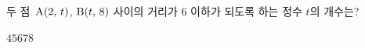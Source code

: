 두 점~$\mathrm{A}(2,\,t)$, $\mathrm{B}(t,\,8)$ 사이의 거리가 $6$ 이하가 되도록 하는 정수 $t$의 개수는?
\begin{choices32}{$4$}{$5$}{$6$}{$7$}{$8$}\end{choices32}
